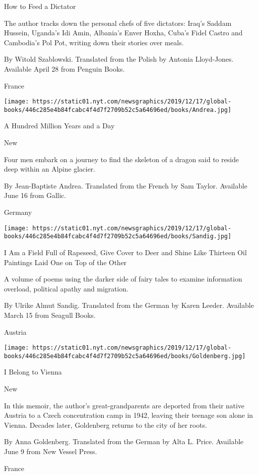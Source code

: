How to Feed a Dictator

The author tracks down the personal chefs of five dictators: Iraq's
Saddam Hussein, Uganda's Idi Amin, Albania's Enver Hoxha, Cuba's Fidel
Castro and Cambodia's Pol Pot, writing down their stories over meals.

 By Witold Szablowski. Translated from the Polish by Antonia
Lloyd-Jones. Available April 28 from Penguin Books.

France

\texttt{[image: https://static01.nyt.com/newsgraphics/2019/12/17/global-books/446c285e4b84fcabc4f4d7f2709b52c5a64696ed/books/Andrea.jpg]}

A Hundred Million Years and a Day

New

Four men embark on a journey to find the skeleton of a dragon said to
reside deep within an Alpine glacier.

 By Jean-Baptiste Andrea. Translated from the French by Sam Taylor.
Available June 16 from Gallic.

Germany

\texttt{[image: https://static01.nyt.com/newsgraphics/2019/12/17/global-books/446c285e4b84fcabc4f4d7f2709b52c5a64696ed/books/Sandig.jpg]}

I Am a Field Full of Rapeseed, Give Cover to Deer and Shine Like
Thirteen Oil Paintings Laid One on Top of the Other

A volume of poems using the darker side of fairy tales to examine
information overload, political apathy and migration.

 By Ulrike Almut Sandig. Translated from the German by Karen Leeder.
Available March 15 from Seagull Books.

Austria

\texttt{[image: https://static01.nyt.com/newsgraphics/2019/12/17/global-books/446c285e4b84fcabc4f4d7f2709b52c5a64696ed/books/Goldenberg.jpg]}

I Belong to Vienna

New

In this memoir, the author's great-grandparents are deported from their
native Austria to a Czech concentration camp in 1942, leaving their
teenage son alone in Vienna. Decades later, Goldenberg returns to the
city of her roots.

 By Anna Goldenberg. Translated from the German by Alta L. Price.
Available June 9 from New Vessel Press.

France

